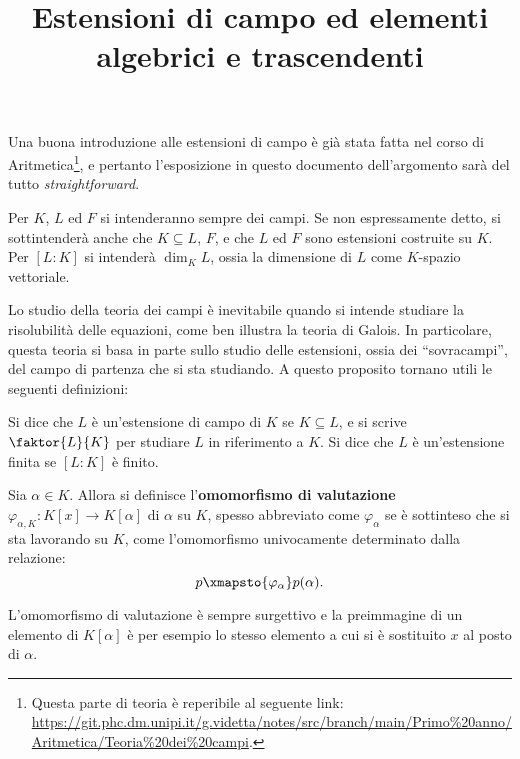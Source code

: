 \documentclass[12pt]{scrartcl}
\begin{document}
	\title{Estensioni di campo ed elementi algebrici e trascendenti}
	\maketitle
	
	\begin{note}
		Una buona introduzione alle estensioni di campo
		è già stata fatta nel corso di Aritmetica\footnote{
			Questa parte di teoria è reperibile al
			seguente link: \url{https://git.phc.dm.unipi.it/g.videtta/notes/src/branch/main/Primo\%20anno/Aritmetica/Teoria\%20dei\%20campi}.
		}, e pertanto
		l'esposizione in questo documento dell'argomento sarà
		del tutto \textit{straightforward}. \medskip
		
		
		Per $K$, $L$ ed $F$ si intenderanno sempre dei campi.
		Se non espressamente detto, si sottintenderà anche
		che $K \subseteq L$, $F$, e che $L$ ed $F$ sono
		estensioni costruite su $K$. Per $[L : K]$ si
		intenderà $\dim_K L$, ossia la dimensione di $L$
		come $K$-spazio vettoriale.
	\end{note} \bigskip

	
	Lo studio della teoria dei campi è inevitabile quando si
	intende studiare la risolubilità delle equazioni, come
	ben illustra la teoria di Galois. In particolare,
	questa teoria si basa in parte sullo studio delle
	estensioni, ossia dei ``sovracampi'', del campo di partenza
	che si sta studiando. A questo proposito tornano utili
	le seguenti definizioni:
	
	\begin{definition}
		Si dice che $L$ è un'estensione di campo di $K$ se
		$K \subseteq L$, e si scrive $\faktor{L}{K}$ per
		studiare $L$ in riferimento a $K$. Si dice
		che $L$ è un'estensione finita se $[L : K]$ è
		finito.
	\end{definition}
	
	\begin{definition}
		Sia $\alpha \in K$. Allora si definisce l'\textbf{omomorfismo di valutazione} $\varphi_{\alpha,K} : K[x] \to K[\alpha]$ di $\alpha$ su $K$,
		spesso abbreviato come $\varphi_\alpha$ se è
		sottinteso che si sta lavorando su $K$, come
		l'omomorfismo univocamente determinato dalla
		relazione:
		\[ p \xmapsto{\varphi_\alpha} p(\alpha). \]
	\end{definition}

	\begin{remark}
		L'omomorfismo di valutazione è sempre surgettivo e
		la preimmagine di un elemento di $K[\alpha]$ è per
		esempio lo stesso elemento a cui si è sostituito $x$
		al posto di $\alpha$.
	\end{remark}
\end{document}
